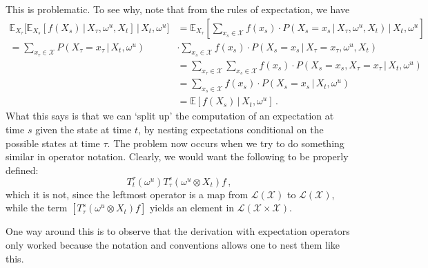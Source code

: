 \documentclass[a4paper,reqno]{amsart}
\newcommand{\states}{\mathcal{X}}
\newcommand{\gambles}{\mathcal{L}}
\newcommand{\gamblesX}{\gambles(\states)}
\begin{document}
This is problematic. To see why, note that from the rules of expectation, we have
\begin{align*}
\mathbb{E}_{X_\tau}\bigl[ \mathbb{E}_{X_s}[f(X_s)\,\vert\,X_\tau,\omega^u,X_t] \,\vert\,X_t,\omega^u\bigr] &= \mathbb{E}_{X_\tau}\left[ \sum_{x_s\in\states} f(x_s)\cdot P(X_s=x_s\,\vert\,X_\tau,\omega^u,X_t) \,\bigg\vert\,X_t,\omega^u\right] \\
 = \sum_{x_\tau\in\states} P(X_\tau=x_\tau\,\vert\,X_t,\omega^u)&\cdot \sum_{x_s\in\states} f(x_s)\cdot P(X_s=x_s\,\vert\,X_\tau=x_\tau,\omega^u,X_t) \\
 &= \sum_{x_\tau\in\states}\sum_{x_s\in\states}f(x_s)\cdot P(X_s=x_s, X_\tau=x_\tau\,\vert\,X_t,\omega^u) \\
 &= \sum_{x_s\in\states} f(x_s)\cdot P(X_s=x_s\,\vert\,X_t,\omega^u) \\
 &= \mathbb{E}[f(X_s)\,\vert\,X_t,\omega^u]\,.
\end{align*}
What this says is that we can `split up' the computation of an expectation at time $s$ given the state at time $t$, by nesting expectations conditional on the possible states at time $\tau$. The problem now occurs when we try to do something similar in operator notation. Clearly, we would want the following to be properly defined:
\begin{equation*}
T_t^\tau(\omega^u)T_\tau^s(\omega^u\otimes X_t) f\,,
\end{equation*}
which it is not, since the leftmost operator is a map from $\gamblesX$ to $\gamblesX$, while the term $[T_\tau^s(\omega^u\otimes X_t) f]$ yields an element in $\gambles(\states\times\states)$.

One way around this is to observe that the derivation with expectation operators only worked because the notation and conventions allows one to nest them like this.
\end{document}
